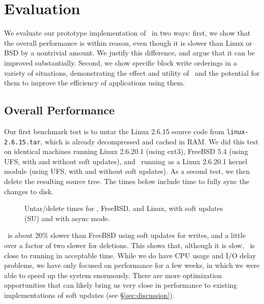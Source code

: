 \section {Evaluation}
\label{sec:evaluation}

We evaluate our prototype implementation of \Kudos\ in two ways: first, we
show that the overall performance is within reason, even though it is slower
than Linux or BSD by a nontrivial amount. We justify this difference, and argue
that it can be improved substantially. Second, we show specific block write
orderings in a variety of situations, demonstrating the effect and utility of
\opgroups\ and the potential for them to improve the efficiency of applications
using them.

\subsection {Overall Performance}

Our first benchmark test is to untar the Linux 2.6.15 source code from
\texttt{linux-2.6.15.tar}, which is already decompressed and cached in RAM. We
did this test on identical machines running Linux 2.6.20.1 (using ext3), FreeBSD
5.4 (using UFS, with and without soft updates), and \Kudos\ running as a Linux
2.6.20.1 kernel module (using UFS, with and without soft updates). As a second
test, we then delete the resulting source tree. The times below include time to
fully sync the changes to disk.

\begin{figure}[htb]
\caption{\label{fig:macro} Untar/delete times for \Kudos, FreeBSD, and Linux,
with soft updates (SU) and with async mode.}
\end{figure}

\Kudos\ is about 20\% slower than FreeBSD using soft updates for
writes, and a little over a factor of two slower for deletions. This
shows that, although it is slow, \Kudos\ is close to running in
acceptable time. While we do have CPU usage and I/O delay problems, we
have only focused on performance for a few weeks, in which we were
able to speed up the system enormously.  There are more optimization
opportunities that can likely bring us very close in performance to
existing implementations of soft updates (see \S\ref{sec:discussion}).

